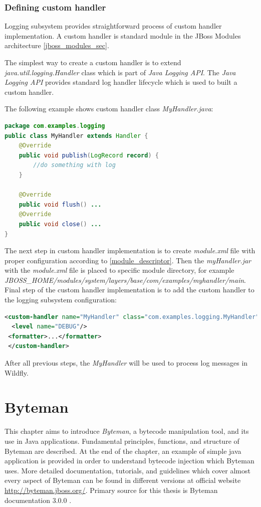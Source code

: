 \documentclass[12pt,oneside]{fithesis2}
\begin{document}
\subsection{Defining custom handler}
\label{custom_handler}
Logging subsystem provides straightforward process of custom handler implementation. A custom handler is standard module in the JBoss Modules architecture \ref{jboss_modules_sec}.

The simplest way to create a custom handler is to extend \textit{java.util.logging.Handler} class which is part of \textit{Java Logging API}. The \textit{Java Logging API} provides standard log handler lifecycle which is used to built a custom handler.

The following example shows custom handler class \textit{MyHandler.java}:
\begin{lstlisting}[caption = Custom handler class, label = custom_handler_class, language=Java]
package com.examples.logging
public class MyHandler extends Handler {
	@Override
	public void publish(LogRecord record) {
		//do something with log
	}
	
	@Override
	public void flush() ...
	@Override
	public void close() ...
}
\end{lstlisting}
\noindent
The next step in custom handler implementation is to create \textit{module.xml} file with proper configuration according to \ref{module_descriptor}. Then the \textit{myHandler.jar} with the \textit{module.xml} file is placed to specific module directory, for example \textit{JBOSS\_HOME/modules/system/layers/base/com/examples/myhandler/main}.
\noindent
Final step of the custom handler implementation is to add the custom handler to the logging subsystem configuration:
\begin{lstlisting}[caption = Adding custom handler to the logging subsystem configuration, label = custom_handler_logging_subsystem, language=XML]
 <custom-handler name="MyHandler" class="com.examples.logging.MyHandler" module="com.examples.myhandler">
  <level name="DEBUG"/>
 <formatter>...</formatter>
 </custom-handler>
\end{lstlisting}
\noindent
After all previous steps, the \textit{MyHandler} will be used to process log messages in Wildfly.

\chapter{Byteman}
\label{byteman_chap}
This chapter aims to introduce \textit{Byteman}, a bytecode manipulation tool, and its use in Java applications. Fundamental principles, functions, and structure of Byteman are described.
At the end of the chapter, an example of simple java application is provided in order to understand bytecode injection which Byteman uses. More detailed documentation, tutorials, and guidelines 
which cover almost every aspect of Byteman can be found in different versions at official website \url{http://byteman.jboss.org/}. Primary source for this thesis is Byteman documentation 3.0.0 \cite{byteman_doc}.
\end{document}
